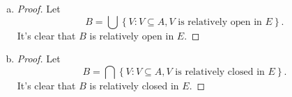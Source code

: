 \begin{Exercise}
\begin{enumerate}[a)]
\item
\begin{proof}
Let $$ B = \bigcup\left\{V:V\subseteq A, V\text{ is relatively open in }E\right\}.$$
It's clear that $B$ is relatively open in $E$.
\end{proof}

\item
\begin{proof}
Let $$ B = \bigcap\left\{V:V\subseteq A, V\text{ is relatively closed in }E\right\}.$$
It's clear that $B$ is relatively closed in $E$.
\end{proof}

\end{enumerate}
\end{Exercise}